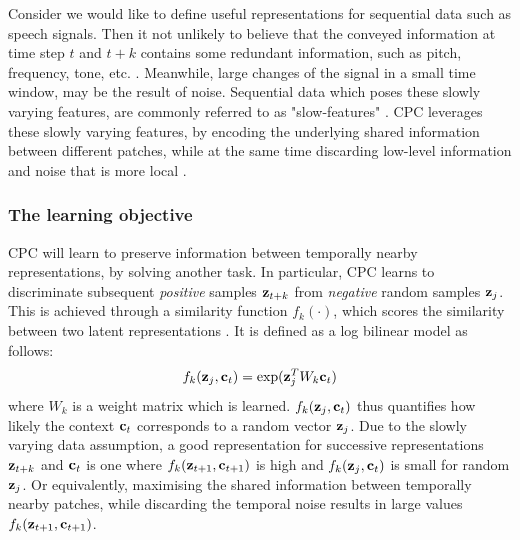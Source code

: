	Consider we would like to define useful representations for sequential data such as speech signals. Then it not unlikely to believe that the conveyed information at time step $t$ and $t+k$ contains some redundant information, such as pitch, frequency, tone, etc. \cite{raoUnderstandingGradientIsolatedLearning2020}. Meanwhile, large changes of the signal in a small time window, may be the result of noise. Sequential data which poses these slowly varying features, are commonly referred to as "slow-features" \cite{zhangSlowFeatureAnalysis2012}. CPC leverages these slowly varying features, by encoding the underlying shared information between different patches, while at the same time discarding low-level information and noise that is more local \cite{oordRepresentationLearningContrastive2019}.


\subsubsection{The learning objective}
	
	
	CPC will learn to preserve information between temporally nearby representations, by solving another task. In particular, CPC learns to discriminate subsequent \textit{positive} samples $\mathbf{z}_{t+k}$ from \textit{negative} random samples $\mathbf{z}_j$. This is achieved through a similarity function $f_k(\cdot)$, which scores the similarity between two latent representations \cite{lowePuttingEndEndtoEnd2020}. It is defined as a log bilinear model as follows:
	\begin{equation} %
		\fkdefinition \label{eq:fk}
	\end{equation}
	where $W_k$ is a weight matrix which is learned. $f_k( \mathbf{z}_j , \mathbf{c}_t )$ thus quantifies how likely the context $\mathbf{c}_t$ corresponds to a random vector $\mathbf{z}_j$. Due to the slowly varying data assumption, a good representation for successive representations $\mathbf{z}_{t+k}$ and $\mathbf{c}_t$ is one where $f_k( \mathbf{z}_{t+1}, \mathbf{c}_{t+1})$ is high and $f_k( \mathbf{z}_j, \mathbf{c}_t)$ is small for random $\mathbf{z}_j$. Or equivalently, maximising the shared information between temporally nearby patches, while discarding the temporal noise results in large values $f_k( \mathbf{z}_{t+1}, \mathbf{c}_{t+1})$.
	
